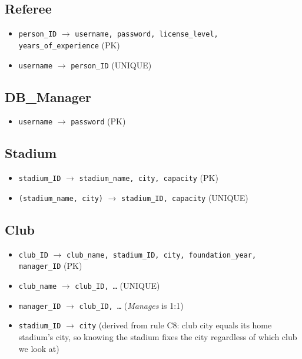 \documentclass[11pt]{article}
\begin{document}
\subsection*{Referee}
\begin{itemize}[leftmargin=*]
  \item \texttt{person\_ID} $\to$ \texttt{username, password, license\_level, years\_of\_experience} \hfill (PK)
  \item \texttt{username} $\to$ \texttt{person\_ID} \hfill (UNIQUE)
\end{itemize}

\subsection*{DB\_Manager}
\begin{itemize}[leftmargin=*]
  \item \texttt{username} $\to$ \texttt{password} \hfill (PK)
\end{itemize}

\subsection*{Stadium}
\begin{itemize}[leftmargin=*]
  \item \texttt{stadium\_ID} $\to$ \texttt{stadium\_name, city, capacity} \hfill (PK)
  \item \texttt{(stadium\_name, city)} $\to$ \texttt{stadium\_ID, capacity} \hfill (UNIQUE)
\end{itemize}

\subsection*{Club}
\begin{itemize}[leftmargin=*]
  \item \texttt{club\_ID} $\to$ \texttt{club\_name, stadium\_ID, city, foundation\_year, manager\_ID} \hfill (PK)
  \item \texttt{club\_name} $\to$ \texttt{club\_ID, \dots} \hfill (UNIQUE)
  \item \texttt{manager\_ID} $\to$ \texttt{club\_ID, \dots} \hfill (\emph{Manages} is 1:1)
  \item \texttt{stadium\_ID} $\to$ \texttt{city} \hfill (derived from rule C8:
    club city equals its home stadium's city, so knowing the stadium fixes
    the city regardless of which club we look at)
\end{itemize}
\end{document}
